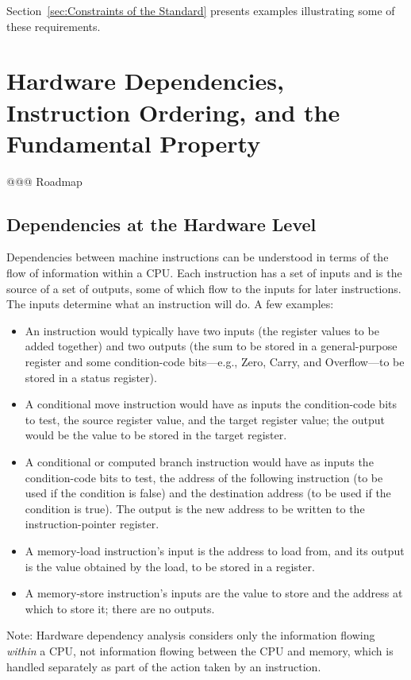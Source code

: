 \documentclass[10]{article}
\begin{document}
Section~\ref{sec:Constraints of the Standard}
presents examples illustrating some of these requirements.

\section{Hardware Dependencies, Instruction Ordering, and the
Fundamental Property}
\label{sec:Hardware Dependencies, Instruction Ordering, and the
Fundamental Property}

@@@ Roadmap

\subsection{Dependencies at the Hardware Level}
\label{sec:Dependencies at the Hardware Level}

Dependencies between machine instructions can be understood in terms
of the flow of information within a CPU.
Each instruction has a set of inputs and is the source of a set of outputs,
some of which flow to the inputs for later instructions.
The inputs determine what an instruction will do.
A few examples:
\begin{itemize}
\item	An  instruction would typically have two inputs
	(the register values to be added together) and two outputs
	(the sum to be stored in a general-purpose register and some
	condition-code bits---e.g., Zero, Carry, and Overflow---to be
	stored in a status register).
\item	A conditional move instruction would have as inputs the
	condition-code bits to test, the source register value, and the
	target register value; the output would be the value to be stored
	in the target register.
\item	A conditional or computed branch instruction would have as inputs
	the condition-code bits to test, the address of the following
	instruction (to be used if the condition is false) and the
	destination address (to be used if the condition is true).
	The output is the new address to be written to the
	instruction-pointer register.
\item	A memory-load instruction's input is the address to load from,
	and its output is the value obtained by the load, to be stored
	in a register.
\item	A memory-store instruction's inputs are the value to store and
	the address at which to store it; there are no outputs.
\end{itemize}
Note: Hardware dependency analysis considers only the information
flowing \emph{within} a CPU, not information flowing between the
CPU and memory, which is handled separately as part of the action
taken by an instruction.
\end{document}
